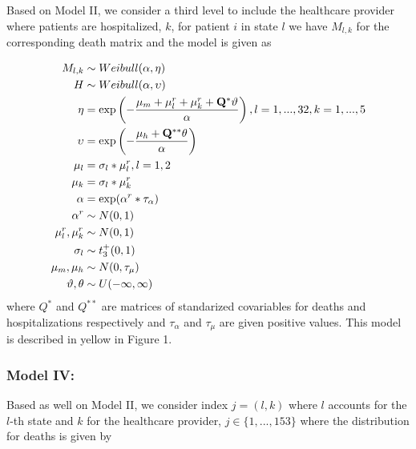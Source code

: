 \documentclass[10pt,letterpaper]{article}
\begin{document}
Based on Model II, we consider a third level to include the healthcare provider where patients are hospitalized, \(k\), for patient \(i\)
in state \(l\) we have \(M_{l,k}\) for the corresponding death matrix
and the model is given as

\[
\begin{aligned}
 M_{l,k}   &\sim Weibull(\alpha,\mathbf{\eta})\\
 H  &\sim Weibull(\alpha,\mathbf{\upsilon}) \\
 \mathbf{\eta} &= \exp \left(-\frac{\mu_m+\mathbf{\mu}_l^r+\mathbf{\mu}_k^r+\mathbf{Q}^*\mathbf{\vartheta}}{\alpha} \right),\space\space l=1,...,32,\space k=1,...,5\\
 \mathbf{\upsilon} &= \exp\left(-\frac{\mu_h+\mathbf{Q}^{**}\mathbf{\theta}}{\alpha}\right) \\
  \mathbf{\mu}_l&=\sigma_l*\mathbf{\mu}_l^r, \space\space l=1,2 \\
 \mathbf{\mu}_k&=\sigma_l*\mathbf{\mu}_k^r \\
 \alpha&=\exp(\alpha^r*\tau_\alpha) \\
 \alpha^r&\sim N(0,1) \\
 \mu^r_l,\mu^r_k &\sim N(0,1) \\
 \sigma_l&\sim t^+_3(0,1) \\
 \mu_m,\mu_h &\sim N(0,\tau_\mu) \\
 \mathbf{\vartheta},\mathbf{\theta} &\sim U(-\infty,\infty) \\
\end{aligned}
\] where \(Q^*\) and \(Q^{**}\) are matrices of standarized covariables
for deaths and hospitalizations respectively and \(\tau_\alpha\) and
\(\tau_{\mu}\) are given positive values. This model is described in
yellow in Figure 1.

\hypertarget{model-iv}{%
\subsubsection{Model IV:}\label{model-iv}}

Based as well on Model II, we consider index \(j=(l,k)\) where
\(l\) accounts for the \(l\)-th state and \(k\) for the healthcare provider, \(j \in \{1,...,153\}\) where the distribution for deaths is given by
\end{document}
